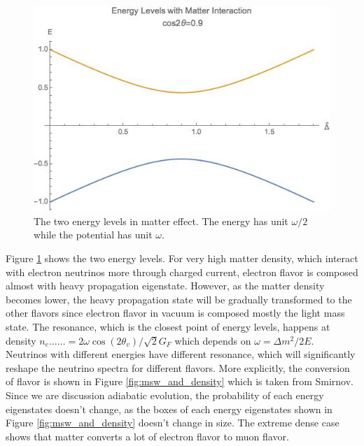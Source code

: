 \documentclass[%
 aip,
 jmp,%
 amsmath,amssymb,
 reprint,%
]{revtex4-1}
\begin{document}
\begin{figure}
\centering
\includegraphics[width=\columnwidth]{assets/mswEnergyLevels.jpg}
\caption{The two energy levels in matter effect. The energy has unit $\omega/2$ while the potential has unit $\omega$.}
\label{fig:mswEnergyLevels}
\end{figure}

Figure \ref{fig:mswEnergyLevels} shows the two energy levels. For very high matter density, which interact with electron neutrinos more through charged current, electron flavor is composed almost with heavy propagation eigenstate. However, as the matter density becomes lower, the heavy propagation state will be gradually transformed to the other flavors since electron flavor in vacuum is composed mostly the light mass state. The resonance, which is the closest point of energy levels, happens at density $n_e……　 = 2\omega \cos(2\theta_v)/\sqrt{2}G_F$ which depends on $\omega = \Delta m^2/2E$. Neutrinos with different energies have different resonance, which will significantly reshape the neutrino spectra for different flavors. More explicitly, the conversion of flavor is shown in
Figure \ref{fig:msw_and_density} which is taken from Smirnov.\cite{Smirnov2003} Since we are discussion adiabatic evolution, the probability of each energy eigenstates doesn't change, as the boxes of each energy eigenstates shown in Figure \ref{fig:msw_and_density} doesn't change in size. The extreme dense case shows that matter converts a lot of electron flavor to muon flavor.
\end{document}
